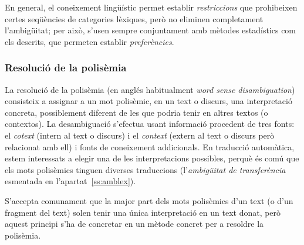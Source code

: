 En general, el coneixement lingüístic permet establir
\emph{restriccions} que prohibeixen certes seqüències de categories
lèxiques, però no eliminen completament l'ambigüitat; per això, s'usen
sempre conjuntament amb mètodes estadístics com els descrits, que
permeten establir \emph{preferències}.

\subsubsection{Resolució de la polisèmia}


La resolució de la polisèmia (en anglés habitualment \emph{word sense
  disambiguation}) consisteix a assignar a un mot polisèmic, en un
text o discurs, una interpretació concreta, possiblement diferent de
les que podria tenir en altres textos (o contextos). La desambiguació
s'efectua usant informació procedent de tres fonts: el \emph{cotext}
(intern al text o discurs) i el \emph{context} (extern al text o
discurs però relacionat amb ell) i fonts de coneixement addicionals.
En traducció automàtica, estem interessats a elegir una de les
interpretacions possibles, perquè és comú que els mots polisèmics
tinguen diverses traduccions (l'\emph{ambigüitat de transferència}
esmentada en l'apartat~\ref{ss:amblex}).

S'accepta comunament que la major part dels mots polisèmics d'un text
(o d'un fragment del text) solen tenir una única interpretació en un
text donat, però aquest principi s'ha de concretar en un mètode
concret per a resoldre la polisèmia.
 
